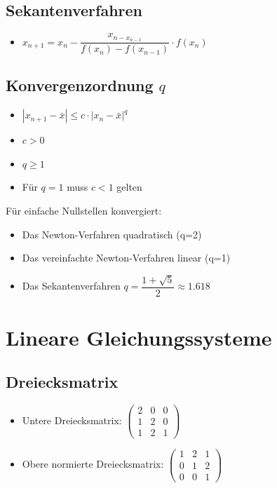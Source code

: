 \documentclass[6pt,a4paper]{scrartcl}
\begin{document}
\begin{multicols*}{4}
		\subsection{Sekantenverfahren}
			\begin{itemize}\itemsep0pt	
				\item $x_{n+1} = x_{n} - \dfrac{x_{n - x_{n-1}}}{f(x_{n}) - f(x_{n-1})} \cdot f(x_{n})$
			\end{itemize}
		\subsection{Konvergenzordnung $q$}
			\begin{itemize}\itemsep0pt	
				\item $|x_{n+1} - \bar{x}| \leq c \cdot |x_{n} - \bar{x}|^{q}$				
				\item $c>0$
				\item $q\geq 1$
				\item Für $q=1$ muss $c<1$ gelten
			\end{itemize}
		
		
			Für einfache Nullstellen konvergiert:
			\begin{itemize}\itemsep0pt	
				\item Das Newton-Verfahren quadratisch (q=2)
				\item Das vereinfachte Newton-Verfahren linear (q=1)
				\item Das Sekantenverfahren $q = \dfrac{1+\sqrt{5}}{2} \approx 1.618$
			\end{itemize}
		
		
	\section{Lineare Gleichungssysteme}
		\subsection{Dreiecksmatrix}
			\begin{itemize}\itemsep0pt		
				\item Untere Dreiecksmatrix: $\begin{pmatrix}2&0&0\\1&2&0\\1&2&1\end{pmatrix}$
				\item Obere normierte Dreiecksmatrix: $\begin{pmatrix}1&2&1\\0&1&2\\0&0&1\end{pmatrix}$
			\end{itemize}
			

\end{multicols*}
\end{document}
